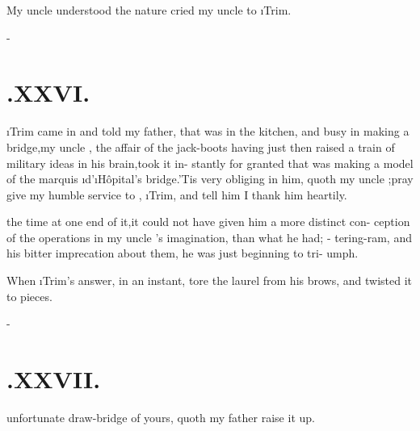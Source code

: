 \documentclass[twoside]{article}
\begin{document}
My uncle \toby understood the nature 
cried my uncle \toby to \i{Trim}.

\null\kern-\baselineskip
\section{.\quad  XXVI.}

 \i{Trim} came in and told my
father, that \drslop was in the\break
kitchen, and busy in making a bridge,\tsk my uncle
\toby, \tsk the affair of the jack-boots having just then
raised a train of military ideas in his brain,\tsk took it
in-
stantly for granted that \drslop was making a model
of the marquis \i{d}’\i{Hôpital}’s bridge.\tsh ’Tis
very obliging in him, quoth my uncle \toby;\tsk pray
give my humble service to \drslop, \i{Trim},
and tell him I thank him heartily.

\break
the time at one end of it,\tsk it could\break
not have given him a more distinct con-\break
ception of the operations in my uncle\break
\toby's imagination, than what he had;\break
{}-\break
tering-ram, and his bitter imprecation\break
about them, he was just beginning to tri-\break
umph.\tsh

When \i{Trim}’s answer, in an instant,\break
tore the laurel from his brows, and\break 
twisted it to pieces.


\null\kern-\baselineskip
\section{.\quad  XXVII.}

 unfortunate draw-bridge\break
of yours, quoth my father\tsk\break
{} 
raise it up.
\end{document}
